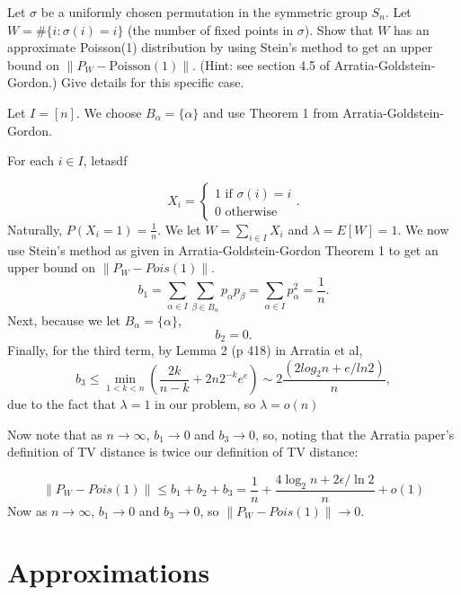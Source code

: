 \documentclass{article}
\newcommand{\answer}[1]{%
  \begin{tcolorbox}[
    colback=gray!9.8,
    boxrule=0.5pt,
    breakable]
  \small #1
  \end{tcolorbox}}
\begin{document}
\begin{example}
    Let $\sigma$ be a uniformly chosen permutation in the symmetric group $S_n$. Let $W = \#\{i : \sigma(i) = i\}$ (the number of fixed points in $\sigma$). Show that $W$ has an approximate Poisson(1) distribution by using Stein's method to get an upper bound on $\|P_W - \text{Poisson}(1)\|$. (Hint: see section 4.5 of Arratia-Goldstein-Gordon.) Give details for this specific case.

\answer{
Let $I = [n]$. We choose $B_\alpha = \{\alpha\}$ and use Theorem 1 from Arratia-Goldstein-Gordon. 

For each $i\in I$, letasdf

$$X_i = \begin{cases}
    1 \text{ if } \sigma(i) = i\\
    0 \text{ otherwise}
\end{cases}.$$
Naturally, $P(X_i =1) = \frac{1}{n}$. We let $W = \sum_{i\in I} X_i$ and $\lambda = E[W] = 1$. We now use Stein's method as given in Arratia-Goldstein-Gordon Theorem 1 to get an upper bound on $\lVert P_W - Pois(1)\rVert$.
$$b_1 = \sum_{\alpha\in I} \sum_{\beta \in B_\alpha} p_\alpha p_\beta = \sum_{\alpha \in I} p_\alpha^2 = \frac{1}{n}.$$
Next, because we let $B_\alpha = \{\alpha\}$, 
$$b_2 = 0.$$
Finally, for the third term, by Lemma 2 (p 418) in Arratia et al,
$$b_3 \leq \min_{1<k<n} (\frac{2k}{n-k} + 2n 2^{-k} e^{e})\sim 2\frac{(2log_2 n + e/ln 2)}{n},$$
due to the fact that $\lambda=1$ in our problem, so $\lambda = o(n)$

Now note that as $n\to \infty$, $b_1\to 0$ and $b_3\to 0$, so, noting that the Arratia paper's definition of TV distance is twice our definition of TV distance:

$$\lVert P_W - Pois(1)\rVert\leq b_1 + b_2 + b_3 = \frac{1}{n} + \frac{4\log_2 n + 2\epsilon/\ln 2}{n} + o(1)$$
Now as $n\to \infty$, $b_1 \to 0$ and $b_3 \to 0$, so $\lVert P_W - Pois(1)\rVert \to 0$. 
}
\end{example}

\begin{example}
    
\end{example}



\newpage 
\section{Approximations}
\end{document}
